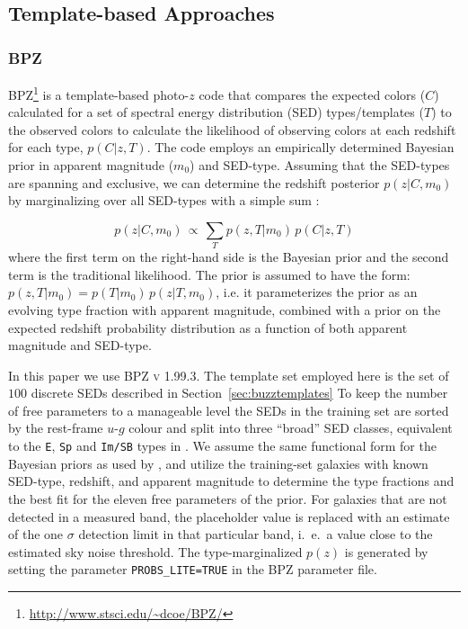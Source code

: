 \subsection{Template-based Approaches}
\label{sec:templatecodes}

\subsubsection{BPZ}
\label{sec:BPZ}

\textsc{BPZ}\footnote{\url{http://www.stsci.edu/~dcoe/BPZ/}} \citep[Bayesian Photometric Redshift,][]{Benitez:00} is a template-based photo-$z$ code that compares the expected colors ($C$) calculated for a set of spectral energy distribution (SED) types/templates ($T$) to the observed colors to calculate the likelihood of observing colors at each redshift for each type, $p(C|z,T)$. The code employs an empirically determined Bayesian prior in apparent magnitude ($m_0$) and SED-type. Assuming that the SED-types are spanning and exclusive, we can determine the redshift posterior $p(z|C,m_0)$ by marginalizing over all SED-types with a simple sum \citep[Eq.~3 from][]{Benitez:00}:

\begin{equation} \label{eq:redshift_posterior}
p(z|C,m_0)\,\propto\, \sum_{T}p(z,T|m_0)\,p(C|z,T)
\end{equation}
\noindent where the first term on the right-hand side is the Bayesian prior and the second term is the traditional likelihood. The prior is assumed to have the form: $p(z,T|m_0)=p(T|m_0)\,p(z|T,m_0)$, i.e. it parameterizes the prior as an evolving type fraction with apparent magnitude, combined with a prior on the expected redshift probability distribution as a function of both apparent magnitude and SED-type.

In this paper we use \textsc{BPZ v 1.99.3}. The template set employed here is the set of $100$ discrete SEDs described in Section~\ref{sec:buzztemplates}
To keep the number of free parameters to a manageable level the SEDs in the training set are sorted by the rest-frame $u$-$g$ colour and split into three ``broad'' SED classes, equivalent to the \texttt{E}, \texttt{Sp} and \texttt{Im/SB} types in \citet{Benitez:00}. We assume the same functional form for the Bayesian priors as used by \citet{Benitez:00}, and utilize the training-set galaxies with known SED-type, redshift, and apparent magnitude to determine the type fractions and the best fit for the eleven free parameters of the prior.
For galaxies that are not detected in a measured band, the placeholder value is replaced with an estimate of the one $\sigma$ detection limit in that particular band, i.~e.~a value close to the estimated sky noise threshold.
The type-marginalized $p(z)$ is generated by setting the parameter \texttt{PROBS\_LITE=TRUE} in the \textsc{BPZ} parameter file.

